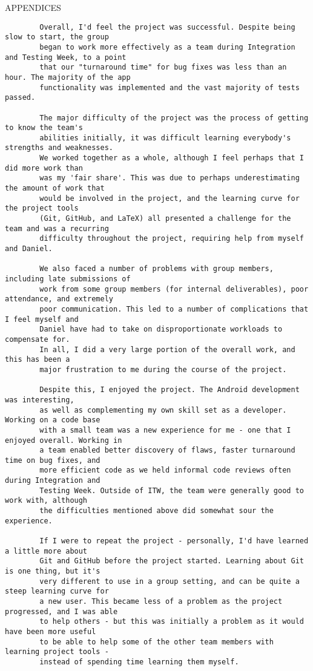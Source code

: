 \documentclass{article}
\begin{document}
\begin{section}{APPENDICES}
\begin{verbatim}
		Overall, I'd feel the project was successful. Despite being slow to start, the group
		began to work more effectively as a team during Integration and Testing Week, to a point
		that our "turnaround time" for bug fixes was less than an hour. The majority of the app
		functionality was implemented and the vast majority of tests passed.

		The major difficulty of the project was the process of getting to know the team's
		abilities initially, it was difficult learning everybody's strengths and weaknesses.
		We worked together as a whole, although I feel perhaps that I did more work than
		was my 'fair share'. This was due to perhaps underestimating the amount of work that
		would be involved in the project, and the learning curve for the project tools 
		(Git, GitHub, and LaTeX) all presented a challenge for the team and was a recurring
		difficulty throughout the project, requiring help from myself and Daniel.

		We also faced a number of problems with group members, including late submissions of
		work from some group members (for internal deliverables), poor attendance, and extremely
		poor communication. This led to a number of complications that I feel myself and
		Daniel have had to take on disproportionate workloads to compensate for.
		In all, I did a very large portion of the overall work, and this has been a
		major frustration to me during the course of the project.

		Despite this, I enjoyed the project. The Android development was interesting,
		as well as complementing my own skill set as a developer. Working on a code base
		with a small team was a new experience for me - one that I enjoyed overall. Working in
		a team enabled better discovery of flaws, faster turnaround time on bug fixes, and
		more efficient code as we held informal code reviews often during Integration and
		Testing Week. Outside of ITW, the team were generally good to work with, although
		the difficulties mentioned above did somewhat sour the experience.

		If I were to repeat the project - personally, I'd have learned a little more about 
		Git and GitHub before the project started. Learning about Git is one thing, but it's
		very different to use in a group setting, and can be quite a steep learning curve for 
		a new user. This became less of a problem as the project progressed, and I was able
		to help others - but this was initially a problem as it would have been more useful 
		to be able to help some of the other team members with learning project tools - 
		instead of spending time learning them myself.


\end{verbatim}
\end{section}
\end{document}

